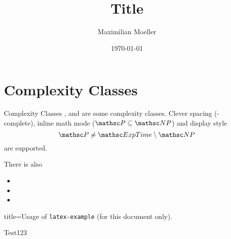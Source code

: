 \documentclass[aspectratio=1610]{beamer}
\author{Maximilian Moeller}
\title{Title}
\date{\today}
\begin{document}
\maketitle


\section{Complexity Classes}

\begin{frame}{Complexity Classes}
\PTime, \NP and  are some complexity classes.
Clever spacing (\NP-complete),
inline math mode ($\PTime \subseteq \NP$)
and display style
\[
	\PTime \neq \ExpTime \setminus \NP
\]
are supported.

There is also
\begin{itemize}
	\item \kExpTime
	\item \NkExpTime 
	\item \kExpTime[4]
\end{itemize}
\end{frame}

\begin{frame}[fragile]
\begin{tcblisting}{title=Usage of \texttt{latex-example} (for this document only).}
	\begin{latex-example}[lefthand width=3.5cm]{Test123}
	\end{latex-example}
\end{tcblisting}
\end{frame}
\end{document}
